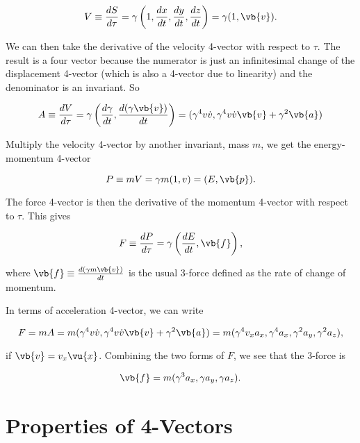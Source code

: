 \documentclass[english,a4paper,12pt]{report}
\begin{document}
\begin{equation}
    V \equiv  \frac{dS}{d\tau } = \gamma \left(1, \frac{dx}{dt}, \frac{dy}{dt}, \frac{dz}{dt}\right) = \gamma (1, \vb{v} ).
\end{equation}

We can then take the derivative of the velocity 4-vector with respect to \(\tau \). The result is a four vector because the numerator is just an infinitesimal change of the displacement 4-vector (which is also a 4-vector due to linearity) and the denominator is an invariant. So

\begin{equation}
    A \equiv  \frac{dV}{d\tau } = \gamma \left(\frac{d\gamma }{dt}, \frac{d(\gamma \vb{v} )}{dt}\right) = (\gamma ^{4}v \dot{v} , \gamma ^{4} v \dot{v} \vb{v} + \gamma ^2 \vb{a})
\end{equation}

Multiply the velocity 4-vector by another invariant, mass \(m\), we get the energy-momentum 4-vector

\begin{equation}
    P \equiv mV = \gamma m(1,v) = (E, \vb{p} ). 
\end{equation}

The force 4-vector is then the derivative of the momentum 4-vector with respect to \(\tau \). This gives

\begin{equation}
    F \equiv \frac{dP}{d\tau } = \gamma \left(\frac{dE}{dt}, \vb{f}\right),
\end{equation}

where \(\vb{f} \equiv \frac{d(\gamma m\vb{v} )}{dt} \) is the usual 3-force defined as the rate of change of momentum.  

In terms of acceleration 4-vector, we can write 

\begin{equation}
    F = mA = m(\gamma ^{4}v \dot{v} , \gamma ^{4} v \dot{v} \vb{v}  + \gamma ^2 \vb{a}  ) = m(\gamma ^{4} v_{x} a_{x}, \gamma ^{4} a_{x}, \gamma ^2 a_{y}, \gamma ^2 a_{z}),
\end{equation}

if \(\vb{v} = v_{x}\vu{x}  \). Combining the two forms of \(F\), we see that the 3-force is

\begin{equation}
    \vb{f} = m(\gamma ^3 a_{x}, \gamma a_{y}, \gamma a_{z}).
\end{equation}

\section{Properties of 4-Vectors}
\end{document}
